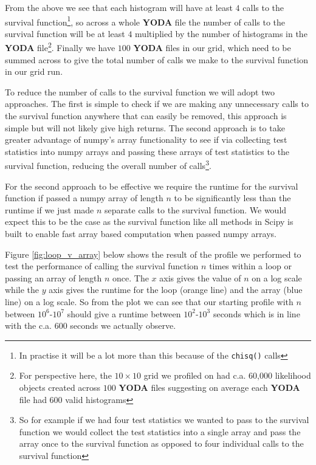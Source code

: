 From the above we see that each histogram will have at least $4$ calls to the survival function\footnote{In practise it will be a lot more than this because of the \texttt{chisq()} calls}, so across a whole \textbf{YODA} file the number of calls to the survival function will be at least $4$ multiplied by the number of histograms in the \textbf{YODA} file\footnote{For perspective here, the $10\times 10$ grid we profiled on had c.a. 60,000 likelihood objects created across $100$ \textbf{YODA} files suggesting on average each \textbf{YODA} file had $600$ valid histograms}. Finally we have $100$ \textbf{YODA} files in our grid, which need to be summed across to give the total number of calls we make to the survival function in our grid run.

To reduce the number of calls to the survival function we will adopt two approaches. The first is simple to check if we are making any unnecessary calls to the survival function anywhere that can easily be removed, this approach is simple but will not likely give high returns. The second approach is to take greater advantage of numpy's array functionality to see if via collecting test statistics into numpy arrays and passing these arrays of test statistics to the survival function, reducing the overall number of calls\footnote{So for example if we had four test statistics we wanted to pass to the survival function we would collect the test statistics into a single array and pass the array once to the survival function as opposed to four individual calls to the survival function}.

For the second approach to be effective we require the runtime for the survival function if passed a numpy array of length $n$ to be significantly less than the runtime if we just made $n$ separate calls to the survival function. We would expect this to be the case as the survival function like all methods in Scipy is built to enable fast array based computation when passed numpy arrays. 

Figure \ref{fig:loop_v_array} below shows the result of the profile we performed to test the performance of calling the survival function $n$ times within a loop or passing an array of length $n$ once. The $x$ axis gives the value of $n$ on a log scale while the $y$ axis gives the runtime for the loop (orange line) and the array (blue line) on a log scale. So from the plot we can see that our starting profile with $n$ between $10^6$-$10^7$ should give a runtime between $10^2$-$10^3$ seconds which is in line with the c.a. $600$ seconds we actually observe.

